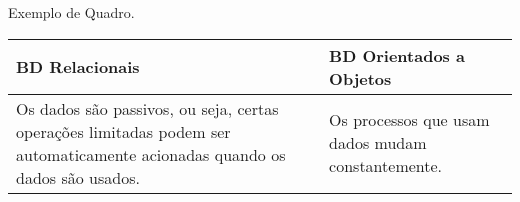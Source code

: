 \begin{quadro}[!htb]
    \centering
    \caption{Exemplo de Quadro.\label{qua:quadro-exemplo1}}
    \begin{tabular}{|p{7cm}|p{7cm}|}
        \hline
        \textbf{BD Relacionais} & \textbf{BD Orientados a Objetos} \\
        \hline
        Os dados são passivos, ou seja, certas operações limitadas podem ser automaticamente acionadas quando os dados são usados. & Os processos que usam dados mudam constantemente. \\
        \hline
    \end{tabular}
\end{quadro}
